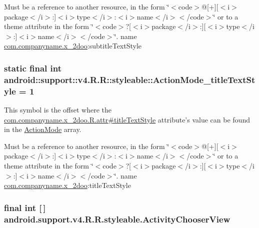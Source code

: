Must be a reference to another resource, in the form \char`\"{}$<$code$>$@\mbox{[}+\mbox{]}\mbox{[}$<$i$>$package$<$/i$>$:\mbox{]}$<$i$>$type$<$/i$>$:$<$i$>$name$<$/i$>$$<$/code$>$\char`\"{} or to a theme attribute in the form \char`\"{}$<$code$>$?\mbox{[}$<$i$>$package$<$/i$>$:\mbox{]}\mbox{[}$<$i$>$type$<$/i$>$:\mbox{]}$<$i$>$name$<$/i$>$$<$/code$>$\char`\"{}.  name \hyperlink{namespacecom_1_1companyname_1_1x__2doo}{com.companyname.x\_\-2doo}:subtitleTextStyle \hypertarget{classandroid_1_1support_1_1v4_1_1_r_1_1styleable_93a05f44280c1708d5a6f3d307415600}{
\subsubsection[{ActionMode\_\-titleTextStyle}]{\setlength{\rightskip}{0pt plus 5cm}static final int android::support::v4.R.R::styleable::ActionMode\_\-titleTextStyle = 1}}
\label{classandroid_1_1support_1_1v4_1_1_r_1_1styleable_93a05f44280c1708d5a6f3d307415600}


This symbol is the offset where the \hyperlink{classcom_1_1companyname_1_1x__2doo_1_1_r_1_1attr_dcb150fd31ab9183bee97759585558cd}{com.companyname.x\_\-2doo.R.attr\#titleTextStyle} attribute's value can be found in the \hyperlink{classandroid_1_1support_1_1v4_1_1_r_1_1styleable_cb0fd98eb07ef010055f95821e8da84e}{ActionMode} array.

Must be a reference to another resource, in the form \char`\"{}$<$code$>$@\mbox{[}+\mbox{]}\mbox{[}$<$i$>$package$<$/i$>$:\mbox{]}$<$i$>$type$<$/i$>$:$<$i$>$name$<$/i$>$$<$/code$>$\char`\"{} or to a theme attribute in the form \char`\"{}$<$code$>$?\mbox{[}$<$i$>$package$<$/i$>$:\mbox{]}\mbox{[}$<$i$>$type$<$/i$>$:\mbox{]}$<$i$>$name$<$/i$>$$<$/code$>$\char`\"{}.  name \hyperlink{namespacecom_1_1companyname_1_1x__2doo}{com.companyname.x\_\-2doo}:titleTextStyle \hypertarget{classandroid_1_1support_1_1v4_1_1_r_1_1styleable_8ebac440352ca658a6c7d0b99e1eb8da}{
\subsubsection[{ActivityChooserView}]{\setlength{\rightskip}{0pt plus 5cm}final int \mbox{[}$\,$\mbox{]} android.support.v4.R.R.styleable.ActivityChooserView}}
\label{classandroid_1_1support_1_1v4_1_1_r_1_1styleable_8ebac440352ca658a6c7d0b99e1eb8da}



